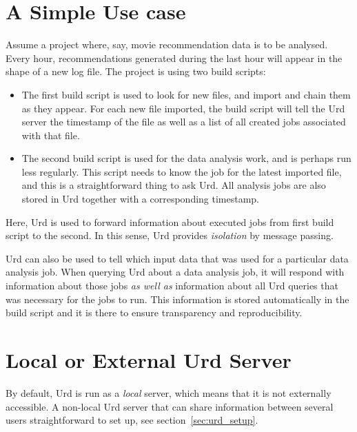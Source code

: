 \section{A Simple Use case}
Assume a project where, say, movie recommendation data is to be
analysed.  Every hour, recommendations generated during the last hour
will appear in the shape of a new log file.  The project is using two
build scripts:
\begin{itemize}
\item[] The first build script is used to look for new files, and
  import and chain them as they appear.  For each new file imported,
  the build script will tell the Urd server the timestamp of the file
  as well as a list of all created jobs associated with that file.

\item[] The second build script is used for the data analysis work,
  and is perhaps run less regularly.  This script needs to know the
  job for the latest imported file, and this is a straightforward
  thing to ask Urd.  All analysis jobs are also stored in Urd together
  with a corresponding timestamp.
\end{itemize}
Here, Urd is used to forward information about executed jobs from
first build script to the second.  In this sense, Urd
provides \textsl{isolation} by message passing.

Urd can also be used to tell which input data that was used for a
particular data analysis job.  When querying Urd about a data analysis
job, it will respond with information about those jobs \textsl{as well
as} information about all Urd queries that was necessary for the jobs
to run.  This information is stored automatically in the build script
and it is there to ensure transparency and reproducibility.



\section{Local or External Urd Server}
By default, Urd is run as a \textsl{local} server, which means that it
is not externally accessible.  A non-local Urd server that can share
information between several users straightforward to set up, see
section~\ref{sec:urd_setup}.



